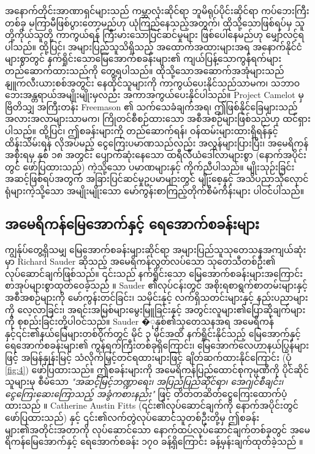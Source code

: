 \documentclass[10pt,twocolumn,letterpaper]{article}
\begin{document}
အနောက်တိုင်းအာဏာရှင်များသည် ကမ္ဘာလုံးဆိုင်ရာ ဘူမိရုပ်ပိုင်းဆိုင်ရာ ကပ်ဘေးကြီးတစ်ခု မကြာမီဖြစ်ပွားတော့မည်ဟု ယုံကြည်နေသည့်အတွက်၊ ထိုသို့သောဖြစ်ရပ်မှ သူတို့ကိုယ်သူတို့ ကာကွယ်ရန် ကြီးမားသောပြင်ဆင်မှုများ ဖြစ်ပေါ်နေမည်ဟု မျှော်လင့်ရပါသည်။ ထို့ပြင်၊ အများပြည်သူသိရှိသည့် အထောက်အထားများအရ အနောက်နိုင်ငံများစွာတွင် နက်ရှိုင်းသောမြေအောက်စခန်းများ၏ ကျယ်ပြန့်သောကွန်ရက်များ တည်ဆောက်ထားသည်ကို တွေ့ရပါသည်။ ထိုသို့သောအဆောက်အအုံများသည် နျူကလီးယားစစ်အတွင်း နေထိုင်သူများကို ကာကွယ်ပေးနိုင်သည်သာမက၊ သဘာဝဘေးအန္တရာယ်အမျိုးမျိုးမှလည်း အကာအကွယ်ပေးနိုင်ပါသည်။ Project Camelot \cite{4,6} မှ ဗြိတိသျှ အကြီးတန်း Freemason ၏ သက်သေခံချက်အရ၊ ဤဖြစ်နိုင်ခြေများသည် အလားအလာများသာမက၊ ကြိုတင်စီစဉ်ထားသော အစီအစဉ်များဖြစ်သည်ဟု ထင်ရှားပါသည်။ ထို့ပြင်၊ ဤစခန်းများကို တည်ဆောက်ရန်၊ ဝန်ထမ်းများထားရှိရန်နှင့် ထိန်းသိမ်းရန် လိုအပ်မည့် ငွေကြေးပမာဏသည်လည်း အလွန်များပြားပြီး၊ အမေရိကန်အစိုးရမှ နှစ် ၁၈ အတွင်း ပျောက်ဆုံးနေသော ထရီလီယံဒေါ်လာများစွာ (နောက်အပိုင်းတွင် ဖော်ပြထားသည်) \cite{11,12,13} ကဲ့သို့သော ပမာဏများနှင့် ကိုက်ညီပါသည်။ မျိုးသုဉ်းခြင်းအဆင့်ဖြစ်ရပ်အတွက် အခြားပြင်ဆင်မှုဥပမာများတွင် မျိုးစေ့နှင့် အသိပညာသိုလှောင်ရုံများကဲ့သို့သော အမျိုးမျိုးသော မော်ကွန်းစာကြည့်တိုက်စီမံကိန်းများ ပါဝင်ပါသည်။
\subsection{အမေရိကန်မြေအောက်နှင့် ရေအောက်စခန်းများ}

ကျွန်ုပ်တွေ့ရှိသမျှ မြေအောက်စခန်းများဆိုင်ရာ အများပြည်သူသုတေသနအကျယ်ဆုံးမှာ Richard Sauder ဆိုသည့် အမေရိကန်လွတ်လပ်သော သုတေသီတစ်ဦး၏ လုပ်ဆောင်ချက်ဖြစ်သည်။ ၎င်းသည် နက်ရှိုင်းသော မြေအောက်စခန်းများအကြောင်း စာအုပ်များစွာထုတ်ဝေခဲ့သည် \cite{22}။ Sauder ၏လုပ်ငန်းတွင် အစိုးရစာရွက်စာတမ်းများနှင့် အစီအစဉ်များကို မော်ကွန်းတင်ခြင်း၊ သမိုင်းနှင့် လက်ရှိသတင်းများနှင့် နည်းပညာများကို လေ့လာခြင်း၊ အရင်းအမြစ်များမွေးမြူခြင်းနှင့် အတွင်းလူများ၏ပြောဆိုချက်များကို စုစည်းခြင်းတို့ပါဝင်သည်။ Sauder �ုနှစ်၏သုတေသနအရ အမေရိကန်နှင့်၎င်း၏နယ်မြေများတစ်ဝိုက်တွင် မိုင် ၃ မိုင်အထိ နက်ရှိုင်းနိုင်သည့် မြေအောက်နှင့် ရေအောက်စခန်းများ၏ ကွန်ရက်ကြီးတစ်ခုရှိကြောင်း၊ မြေအောက်လေဟာနယ်ပြွန်များဖြင့် အမြန်နှုန်းမြင့် သံလိုက်မြှင့်တင်ရထားများဖြင့် ချိတ်ဆက်ထားနိုင်ကြောင်း (ပုံ \ref{fig:4}) ဖော်ပြထားသည်။ ဤစခန်းများကို အမေရိကန်ပြည်ထောင်စုကုမ္ပဏီကို ပိုင်ဆိုင်သူများမှ စီမံသော \textit{"အဆင့်မြင့်ဘဏ္ဍာရေး၊ အပြည်ပြည်ဆိုင်ရာ၊ အေဂျင်စီချင်း၊ ငွေကြေးဆေးကြောသည့် အခွံကစားနည်း"} ဖြင့် တိတ်တဆိတ်ငွေကြေးထောက်ပံ့ထားသည် \cite{22}။ Catherine Austin Fitts (၎င်း၏လုပ်ဆောင်ချက်ကို နောက်အပိုင်းတွင် ဖော်ပြထားသည်) နှင့် ၎င်း၏လက်တွဲလုပ်ဆောင်သူတစ်ဦးတို့မှ ဤစခန်းများ၏အတိုင်းအတာကို လုပ်ဆောင်သော နောက်ထပ်လုပ်ဆောင်ချက်တစ်ခုတွင် အမေရိကန်မြေအောက်နှင့် ရေအောက်စခန်း ၁၇၀ ခန့်ရှိကြောင်း ခန့်မှန်းချက်ထုတ်ခဲ့သည် \cite{16,20}။
\end{document}
